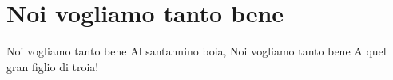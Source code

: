 \section{Noi vogliamo tanto bene}
\subtitle{Su “Noi vogliamo tanto bene alla Polizia Italiana”}
\begin{canzone}
Noi vogliamo tanto bene 
Al santannino boia,
Noi vogliamo tanto bene 
A quel gran figlio di troia!
\end{canzone}

